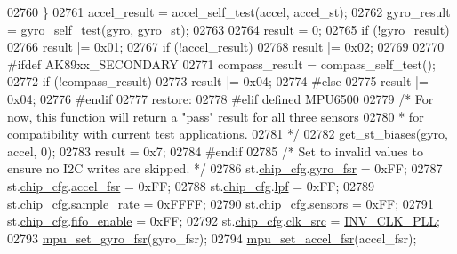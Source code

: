 \begin{DoxyCode}
{{{{{{{{{{{{{{{{{{{{{{{{{{{{{{{{{{02760     \}
02761     accel\_result = accel\_self\_test(accel, accel\_st);
02762     gyro\_result = gyro\_self\_test(gyro, gyro\_st);
02763 
02764     result = 0;
02765     \textcolor{keywordflow}{if} (!gyro\_result)
02766         result |= 0x01;
02767     \textcolor{keywordflow}{if} (!accel\_result)
02768         result |= 0x02;
02769 
02770 \textcolor{preprocessor}{#ifdef AK89xx\_SECONDARY}
02771     compass\_result = compass\_self\_test();
02772     \textcolor{keywordflow}{if} (!compass\_result)
02773         result |= 0x04;
02774 \textcolor{preprocessor}{#else}
02775         result |= 0x04;
02776 \textcolor{preprocessor}{#endif}
02777 restore:
02778 \textcolor{preprocessor}{#elif defined MPU6500}
02779     \textcolor{comment}{/* For now, this function will return a "pass" result for all three sensors}
02780 \textcolor{comment}{     * for compatibility with current test applications.}
02781 \textcolor{comment}{     */}
02782     get\_st\_biases(gyro, accel, 0);
02783     result = 0x7;
02784 \textcolor{preprocessor}{#endif}
02785     \textcolor{comment}{/* Set to invalid values to ensure no I2C writes are skipped. */}
02786     st.\hyperlink{structgyro__state__s_ac895217592e2084bd520b0be8e9d20ee}{chip\_cfg}.\hyperlink{structchip__cfg__s_abae9129fae33706b5f73b2b1867fcc89}{gyro\_fsr} = 0xFF;
02787     st.\hyperlink{structgyro__state__s_ac895217592e2084bd520b0be8e9d20ee}{chip\_cfg}.\hyperlink{structchip__cfg__s_a97d5de8aa2fab5cc81ca2180130fc6ac}{accel\_fsr} = 0xFF;
02788     st.\hyperlink{structgyro__state__s_ac895217592e2084bd520b0be8e9d20ee}{chip\_cfg}.\hyperlink{structchip__cfg__s_a0a4067140c6a3704b4312ba62b77aadb}{lpf} = 0xFF;
02789     st.\hyperlink{structgyro__state__s_ac895217592e2084bd520b0be8e9d20ee}{chip\_cfg}.\hyperlink{structchip__cfg__s_a1aa4e026c4d2f691506f2d713a405aea}{sample\_rate} = 0xFFFF;
02790     st.\hyperlink{structgyro__state__s_ac895217592e2084bd520b0be8e9d20ee}{chip\_cfg}.\hyperlink{structchip__cfg__s_aaa21c01566947e7007476657cb614e3f}{sensors} = 0xFF;
02791     st.\hyperlink{structgyro__state__s_ac895217592e2084bd520b0be8e9d20ee}{chip\_cfg}.\hyperlink{structchip__cfg__s_a1f258910658cfcf4bed56c0de8637441}{fifo\_enable} = 0xFF;
02792     st.\hyperlink{structgyro__state__s_ac895217592e2084bd520b0be8e9d20ee}{chip\_cfg}.\hyperlink{structchip__cfg__s_a2ac4d2f6d885669a21842e13dd3c5241}{clk\_src} = \hyperlink{inv__mpu_8c_a75570f009627c6f4ddfb2d936d81e207a01b240917a78674d3e387110a6a8f94c}{INV\_CLK\_PLL};
02793     \hyperlink{group___d_r_i_v_e_r_s_gad09e6031c8677adc0b8a39b6deea8e27}{mpu\_set\_gyro\_fsr}(gyro\_fsr);
02794     \hyperlink{group___d_r_i_v_e_r_s_ga2713a96af104cfb2ae8e0ed4c3718119}{mpu\_set\_accel\_fsr}(accel\_fsr);
}}}}}}}}}}}}}}}}}}}}}}}}}}}}}}}}}}
\end{DoxyCode}
